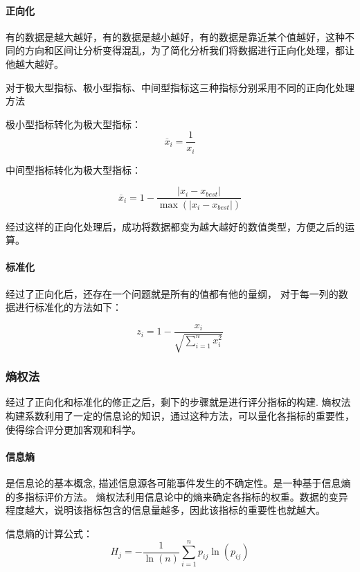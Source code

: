 \documentclass[withoutpreface,bwprint]{cumcmthesis} %
\begin{document}
\paragraph*{正向化}有的数据是越大越好，有的数据是越小越好，有的数据是靠近某个值越好，这种不同的方向和区间让分析变得混乱，为了简化分析我们将数据进行正向化处理，都让他越大越好。

对于极大型指标、极小型指标、中间型指标这三种指标分别采用不同的正向化处理方法

极小型指标转化为极大型指标：
\begin{equation}
    \overline{x}_i = \frac{1}{x_{i}}  
\end{equation}

中间型指标转化为极大型指标：

\begin{equation}
    \overline{x}_i = 1- \frac{\left\lvert x_i - x_{best}\right\rvert }{\max({\left\lvert x_i - x_{best}\right\rvert} ) }
\end{equation}


经过这样的正向化处理后，成功将数据都变为越大越好的数值类型，方便之后的运算。


\paragraph*{标准化}经过了正向化后，还存在一个问题就是所有的值都有他的量纲，
对于每一列的数据进行标准化的方法如下：

\begin{equation}
    z_i = 1- \frac{x_i}{ \sqrt{\sum_{i=1}^n x_{i}^2} } 
\end{equation}

\subsubsection{熵权法}

经过了正向化和标准化的修正之后，剩下的步骤就是进行评分指标的构建.
熵权法构建系数利用了一定的信息论的知识，通过这种方法，可以量化各指标的重要性，使得综合评分更加客观和科学。

\paragraph*{信息熵}是信息论的基本概念, 描述信息源各可能事件发生的不确定性。是一种基于信息熵的多指标评价方法。
熵权法利用信息论中的熵来确定各指标的权重。数据的变异程度越大，说明该指标包含的信息量越多，因此该指标的重要性也就越大。

信息熵的计算公式：
\begin{equation}
    H_j = -\frac{1}{\ln(n)} \sum_{i=1}^{n} p_{ij} \ln(p_{ij})
\end{equation}
    
\end{document}
